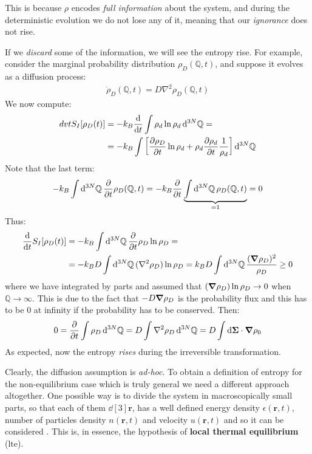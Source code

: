 \documentclass[../template.tex]{subfiles}
\begin{document}
\medskip

This is because $\rho$ encodes \textit{full information} about the system, and during the deterministic evolution we do not lose any of it, meaning that our \textit{ignorance} does not rise.

\medskip

If we \textit{discard} some of the information, we will see the entropy rise. For example, consider the marginal probability distribution $\rho_D(\mathbb{Q}, t)$, and suppose it evolves as a diffusion process:
\begin{align} \label{eqn:93}
    \dot{\rho}_D(\mathbb{Q},t) = D \nabla^2 \rho_D(\mathbb{Q},t)
\end{align} 
We now compute:
\begin{align*}
    dv{t} S_I[\rho_D(t)] &= -k_B \dv{t} \int \rho_d \ln \rho_d \dd[3N]{\mathbb{Q}} = \\
    &= -k_B \int \left[\pdv{\rho_D}{t} \ln \rho_d + \rho_d \pdv{\rho_d}{t} \frac{1}{\rho_d} \right] \dd[3N]{\mathbb{Q}}
\end{align*}
Note that the last term:
\begin{align*}
    -k_B \int \dd[3N]{\mathbb{Q}} \pdv{t} \rho_D(\mathbb{Q},t) = -k_B \pdv{t} \underbrace{\int \dd[3N]{\mathbb{Q}} \rho_D(\mathbb{Q},t)}_{=1} = 0 
\end{align*}
Thus:
\begin{align}\label{eqn:94}
    \dv{t} S_I[\rho_D(t)] &= -k_B \int \dd[3N]{\mathbb{Q}} \pdv{t} \rho_D \ln \rho_D = \\
    &= -k_B D \int \dd[3N]{\mathbb{Q}} (\nabla^2 \rho_D) \ln \rho_D = k_B D \int \dd[3N]{\mathbb{Q}} \frac{(\grad \rho_D)^2}{\rho_D} \geq 0 
\end{align}
where we have integrated by parts and assumed that $(\grad \rho_D) \ln \rho_D \to 0$ when $\mathbb{Q} \to \infty$. This is due to the fact that $-D \grad \rho_D$ is the probability flux and this has to be $0$ at infinity if the probability has to be conserved. Then:
\begin{align}\label{eqn:95}
    0 = \pdv{t} \int \rho_D \dd[3N]{\mathbb{Q}} = D \int \nabla^2 \rho_D \dd[3N]{\mathbb{Q}} =D \int \dd{\bm{\Sigma}} \cdot \grad \rho_0
\end{align}
As expected, now the entropy \textit{rises} during the irreversible transformation.

\medskip

Clearly, the diffusion assumption is \textit{ad-hoc}. To obtain a definition of entropy for the non-equilibrium case which is truly general we need a different approach altogether. One possible way is to divide the system in macroscopically small parts, so that each of them $\dd[3]{\bm{r}}$, has a well defined energy density $\epsilon(\bm{r},t)$, number of particles density $n(\bm{r},t)$ and velocity $u(\bm{r},t)$ and so it can be considered . This is, in essence, the hypothesis of \textbf{local thermal equilibrium} (lte).
\end{document}
